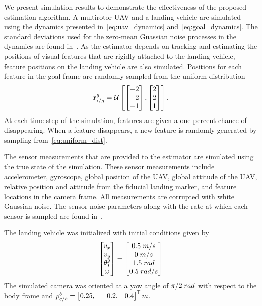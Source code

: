 
We present simulation results to demonstrate the effectiveness of the proposed estimation
algorithm.
A multirotor UAV and a landing vehicle are simulated using the dynamics presented
in~\eqref{eq:uav_dynamics} and~\eqref{eq:goal_dynamics}.
The standard deviations used for the zero-mean
Guassian noise processes in the dynamics are found
in~.
As the estimator depends on
tracking and estimating the positions of visual features that are rigidly
attached to the landing vehicle, feature positions on the landing vehicle
are also simulated.
Positions for each feature in the goal frame are
randomly sampled from the
uniform distribution
\begin{equation}
  \boldsymbol{\mathrm{r}}_{i/g}^g = \mathcal{U}
  \left[ \begin{bmatrix} -2 \\ -2 \\ -1 \end{bmatrix},
  \begin{bmatrix} 2 \\ 2 \\ 1 \end{bmatrix} \right].
  \label{eq:uniform_dist}
\end{equation}
At each time step of the simulation, features are given a one percent chance
of disappearing. When a feature disappears, a new feature is randomly
generated by sampling from~\eqref{eq:uniform_dist}.

The sensor measurements that are provided to the estimator are simulated using the true
state of the simulation. These sensor measurements include accelerometer,
gyroscope, global position of the UAV, global attitude 
of the UAV, relative position and attitude from the fiducial landing marker, and
feature locations in the camera frame. All measurements are
corrupted with white Gaussian noise. The sensor noise parameters along with the
rate at which each sensor is sampled are found
in~.

The landing vehicle was initialized with initial conditions given by
\begin{equation}
  \begin{bmatrix}
    v_x \\
    v_y \\
    \theta_I^g \\
    \omega
  \end{bmatrix}
  =
  \begin{bmatrix}
    0.5 \hphantom{\cdot} m/s \\
    0 \hphantom{\cdot} m/s \\
    1.5 \hphantom{\cdot} rad \\
    0.5 \hphantom{\cdot} rad/s
  \end{bmatrix}
\end{equation}
The 
simulated camera was oriented at a yaw angle of $\pi/2 \hphantom{\cdot} rad$ with respect to the body
frame and $p_{c/b}^b = \begin{bmatrix}0.25, & -0.2, &
0.4 \end{bmatrix}^{\mathsf{T}} m$.

